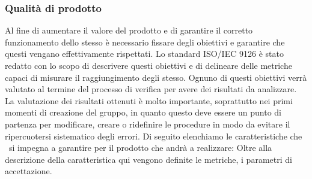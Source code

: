 \subsubsection{Qualità di prodotto}
Al fine di aumentare il valore del prodotto e di garantire il corretto funzionamento dello stesso è necessario fissare degli obiettivi e garantire che questi vengano effettivamente rispettati.
Lo standard ISO/IEC 9126 è stato redatto con lo scopo di descrivere questi obiettivi e di delineare delle metriche capaci di misurare il raggiungimento degli stesso.
Ognuno di questi obiettivi verrà valutato al termine del processo di verifica per avere dei risultati da analizzare. La valutazione dei risultati ottenuti è molto importante, soprattutto nei primi momenti di creazione del gruppo, in quanto questo deve essere un punto di partenza per modificare, creare o ridefinire le procedure in modo da evitare il ripercuotersi sistematico degli errori.
Di seguito elenchiamo le caratteristiche che \gruppo ~si impegna a garantire per il prodotto che andrà a realizzare: Oltre alla descrizione della caratteristica qui vengono definite le metriche, i parametri di accettazione. 
